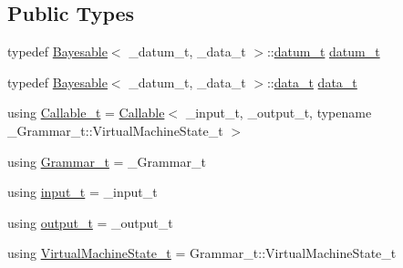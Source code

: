 \subsection*{Public Types}
\begin{DoxyCompactItemize}
\item 
typedef \hyperlink{class_bayesable}{Bayesable}$<$ \+\_\+datum\+\_\+t, \+\_\+data\+\_\+t $>$\+::\hyperlink{class_l_o_t_hypothesis_a3da7a75d135620a3d48a3bfe0be11401}{datum\+\_\+t} \hyperlink{class_l_o_t_hypothesis_a3da7a75d135620a3d48a3bfe0be11401}{datum\+\_\+t}
\item 
typedef \hyperlink{class_bayesable}{Bayesable}$<$ \+\_\+datum\+\_\+t, \+\_\+data\+\_\+t $>$\+::\hyperlink{class_l_o_t_hypothesis_ad1394085e1aea271eb0f5536350b1068}{data\+\_\+t} \hyperlink{class_l_o_t_hypothesis_ad1394085e1aea271eb0f5536350b1068}{data\+\_\+t}
\item 
using \hyperlink{class_l_o_t_hypothesis_ab635fd5106a80f66c2ce04123b969611}{Callable\+\_\+t} = \hyperlink{class_callable}{Callable}$<$ \+\_\+input\+\_\+t, \+\_\+output\+\_\+t, typename \+\_\+\+Grammar\+\_\+t\+::\+Virtual\+Machine\+State\+\_\+t $>$
\item 
using \hyperlink{class_l_o_t_hypothesis_a5393058e614835e0f139bd40acb183b2}{Grammar\+\_\+t} = \+\_\+\+Grammar\+\_\+t
\item 
using \hyperlink{class_l_o_t_hypothesis_aeb5adc395a32008d9fe1b5fb7ba75e95}{input\+\_\+t} = \+\_\+input\+\_\+t
\item 
using \hyperlink{class_l_o_t_hypothesis_ae524caf92d167011278706b6af8bf0bb}{output\+\_\+t} = \+\_\+output\+\_\+t
\item 
using \hyperlink{class_l_o_t_hypothesis_a9121619ee7a99c2c5a177e38e3e098fc}{Virtual\+Machine\+State\+\_\+t} = Grammar\+\_\+t\+::\+Virtual\+Machine\+State\+\_\+t
\end{DoxyCompactItemize}
